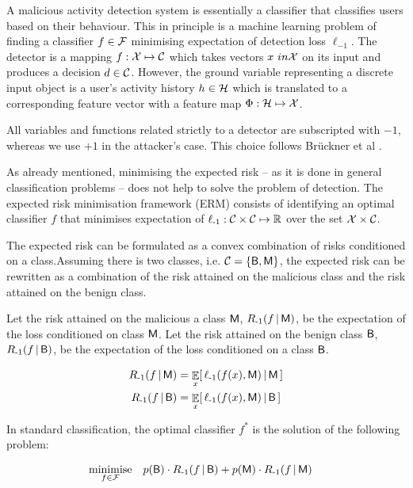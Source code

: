 A malicious activity detection system is essentially a classifier that classifies users based on their behaviour. This in principle is a machine learning problem of finding a classifier $f \in \mathcal{F}$ minimising expectation of detection loss $\ell_{-1}$. The detector is a mapping $f: \mathcal{X} \mapsto \mathcal{C}$ which takes vectors $x \ in \mathcal{X}$ on its input and produces a decision $d \in \mathcal{C}$. However, the ground variable representing a discrete input object is a user's activity history $h \in \mathcal{H}$ which is translated to a corresponding feature vector with a feature map $\Phi: \mathcal{H} \mapsto \mathcal{X}$.

All variables and functions related strictly to a detector are subscripted with $-1$, whereas we use $+1$ in the attacker's case. This choice follows Brückner et al \cite{stackelberg_games}.

As already mentioned, minimising the expected risk – as it is done in general classification problems – does not help to solve the problem of detection. The expected risk minimisation framework (ERM) consists of identifying an optimal classifier $f$ that minimises expectation of $\ell_{{\text{-}1}} : \mathcal{C} \times \mathcal{C} \mapsto \mathbb{R}$ over the set $\mathcal{X} \times \mathcal{C}$.

 The expected risk can be formulated as a convex combination of risks conditioned on a class.Assuming there is two classes, i.e. $\mathcal{C} = \{ \mathsf{B}, \mathsf{M} \}$, the expected risk can be rewritten as a combination of the risk attained on the malicious class and the risk attained on the benign class.

\begin{definition}\label{def:risk}
    Let the risk attained on the malicious a class $\mathsf{M}$, $R_{{\text{-}1}}(f \,|\, \mathsf{M})$, be the expectation of the loss conditioned on class $\mathsf{M}$. Let the risk attained on the benign class $\mathsf{B}$, $R_{{\text{-}1}}(f \,|\, \mathsf{B})$, be the expectation of the loss conditioned on a class $\mathsf{B}$.

    \begin{align}
        R_{{\text{-}1}}(f \,|\, \mathsf{M})  &= \mathop{\mathbb{E}}_{x} [\, \ell_{{\text{-}1}}(f(x), \mathsf{M}) \,|\, \mathsf{M} \,] \\
        R_{{\text{-}1}}(f \,|\, \mathsf{B})  &= \mathop{\mathbb{E}}_{x} [\, \ell_{{\text{-}1}}(f(x), \mathsf{M}) \,|\, \mathsf{B} \,]
    \end{align}

\end{definition}

\begin{definition}\label{def:erm}
    In standard classification, the optimal classifier $f^*$ is the solution of the following problem:

    \begin{equation}\label{eq:erm}
        \begin{aligned}
        & \underset{f \in \mathcal{F}} {\text{minimise}}
        & & p(\mathsf{B}) \cdot R_{{\text{-}1}}(f \,|\, \mathsf{B})
        +
        p(\mathsf{M}) \cdot R_{{\text{-}1}}(f \,|\, \mathsf{M})
        \end{aligned}
    \end{equation}
\end{definition}


